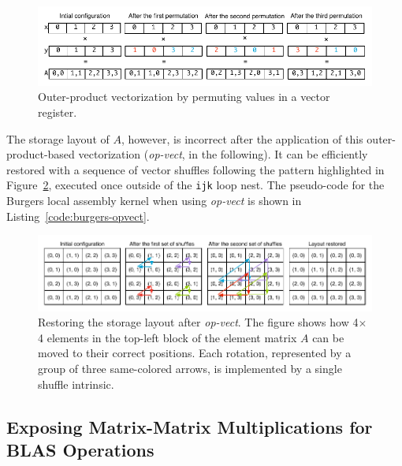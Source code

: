 
\begin{figure}
\centerline{\includegraphics[scale=0.6]{coffee/pictures/vect-by-vect-inline.pdf}}
\caption{Outer-product vectorization by permuting values in a vector register.}
\label{fig:vect-by-vect}
\end{figure}

The storage layout of $A$, however, is incorrect after the application of this outer-product-based vectorization (\emph{op-vect}, in the following). It can be efficiently restored with a sequence of vector shuffles following the pattern highlighted in Figure~\ref{fig:restore-layout}, executed once outside of the \texttt{ijk} loop nest. The pseudo-code for the Burgers local assembly kernel when using \emph{op-vect} is shown in Listing~\ref{code:burgers-opvect}.

\begin{figure}
\centerline{\includegraphics[scale=0.6]{coffee/pictures/vect-restore-inline.pdf}}
\caption{Restoring the storage layout after \emph{op-vect}. The figure shows how 4$\times$4 elements in the top-left block of the element matrix $A$ can be moved to their correct positions. Each rotation, represented by a group of three same-colored arrows, is implemented by a single shuffle intrinsic.}
\label{fig:restore-layout}
\end{figure}


\subsection{Exposing Matrix-Matrix Multiplications for BLAS Operations}
\label{sec:coffee-blas}

